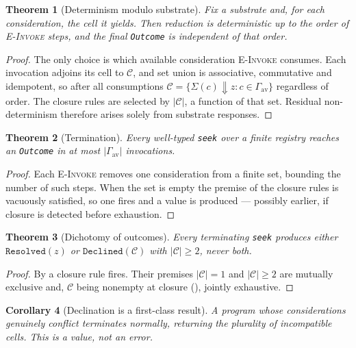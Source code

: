 \documentclass[11pt,a4paper]{article}
\theoremstyle{clstyle}
\newtheorem{theorem}{Theorem}[section]
\newtheorem{corollary}[theorem]{Corollary}
\theoremstyle{definition}
\theoremstyle{remark}
\newcommand{\abs}[1]{\lvert#1\rvert}
\begin{document}
\begin{theorem}[Determinism modulo substrate]
\label{thm:determinism}
Fix a substrate and, for each consideration, the cell it yields. Then
reduction is deterministic up to the order of \textsc{E-Invoke} steps, and
the final \texttt{Outcome} is independent of that order.
\end{theorem}

\begin{proof}
The only choice is which available consideration \textsc{E-Invoke} consumes.
Each invocation adjoins its cell to $\mathcal{C}$, and set union is
associative, commutative and idempotent, so after all consumptions
$\mathcal{C}=\{\Sigma(c)\Downarrow z: c\in\Gamma_{\mathrm{av}}\}$ regardless
of order. The closure rules are selected by $\abs{\mathcal{C}}$, a function
of that set. Residual non-determinism therefore arises solely from substrate
responses.
\end{proof}

\begin{theorem}[Termination]
\label{thm:termination}
Every well-typed \texttt{seek} over a finite registry reaches an
\texttt{Outcome} in at most $\abs{\Gamma_{\mathrm{av}}}$ invocations.
\end{theorem}

\begin{proof}
Each \textsc{E-Invoke} removes one consideration from a finite set, bounding
the number of such steps. When the set is empty the premise of the closure
rules is vacuously satisfied, so one fires and a value is produced --- possibly
earlier, if closure is detected before exhaustion.
\end{proof}

\begin{theorem}[Dichotomy of outcomes]
\label{thm:dichotomy}
Every terminating \texttt{seek} produces either $\texttt{Resolved}(z)$ or
$\texttt{Declined}(\mathcal{C})$ with $\abs{\mathcal{C}}\ge2$, never both.
\end{theorem}

\begin{proof}
By  a closure rule fires. Their premises
$\abs{\mathcal{C}}=1$ and $\abs{\mathcal{C}}\ge2$ are mutually exclusive and,
$\mathcal{C}$ being nonempty at closure (), jointly
exhaustive.
\end{proof}

\begin{corollary}[Declination is a first-class result]
\label{cor:decline}
A program whose considerations genuinely conflict terminates \emph{normally},
returning the plurality of incompatible cells. This is a value, not an error.
\end{corollary}
\end{document}
